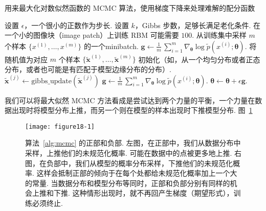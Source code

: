 


\begin{algorithm}
\begin{algorithmic}
\caption{用来最大化对数似然函数的 MCMC 算法，使用梯度下降来处理难解的配分函数}
\label{alg:mcmc}
\STATE 设置 $\epsilon$，一个很小的正数作为步长.
\STATE 设置 $k$，Gibbs 步数，足够长满足老化条件. 在一个小的图像块（image patch）上训练 RBM 可能需要 $100$.
	\STATE 从训练集中采样 $m$ 个样本 $\{x^{(1)},\dots,x^{(m)}\}$ 的一个\gls{minibatch}.
	\STATE $\mathbf{g} \leftarrow \frac{1}{m}\,\sum_{i = 1}^{m} \nabla_{\pmb{\theta}} \log\tilde{p}(x^{(i)};\pmb{\theta})$.
	\STATE 将随机值为对应 $m$ 个样本 $\{\tilde{\mathbf{x}}^{(1)},\dots,\tilde{\mathbf{x}}^{(m)}\}$ 初始化（如，从一个均匀分布或者正态分布，或者也可能是有匹配于模型边缘分布的分布）.
		\STATE $\tilde{\mathbf{x}}^{(j)} \leftarrow \mathrm{gibbs\_update}(\tilde{\mathbf{x}}^{(j)})$
		\ENDFOR
	\ENDFOR
	\STATE $\mathbf{g} \leftarrow \frac{1}{m}\,\sum_{i = 1}^{m} \nabla_{\pmb{\theta}} \log\tilde{p}(x^{(i)};\pmb{\theta})$.
	\STATE $\pmb{\theta} \leftarrow \pmb{\theta} + \epsilon \mathbf{g}$.
\ENDWHILE

\end{algorithmic}
\end{algorithm}

我们可以将最大似然 MCMC 方法看成是尝试达到两个力量的平衡，一个力量在数据出现时将模型分布上推，而另一个则在模型的样本出现时下推模型分布. 
图~\ref{fig:18.1}


\begin{figure}[htp]
\centering \texttt{[image: figure18-1]} 
\caption{算法~\ref{alg:mcmc} 的正部和负部. 左图，在正部中，我们从数据分布中采样，上推他们的未规范化概率. 可能在数据中的点被更多地上推. 右图，在负部中，我们从模型的概率分布采样，下推他们的未规范化概率. 这样会抵制正部的倾向于在每个处都给未规范化概率加上一个大的常量. 当数据分布和模型分布等同时，正部和负部分别有同样的机会上推和下推. 这种情形出现时，就不再回产生梯度（期望形式），训练必须终止.} 
\label{fig:18.1}
\end{figure}



